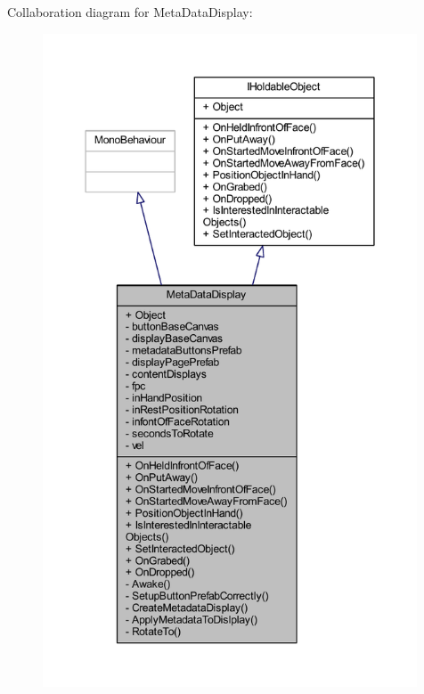 Collaboration diagram for Meta\+Data\+Display\+:
\nopagebreak
\begin{figure}[H]
\begin{center}
\leavevmode
\includegraphics[height=550pt]{class_meta_data_display__coll__graph}
\end{center}
\end{figure}
